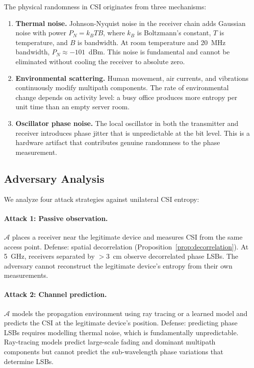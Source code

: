 The physical randomness in CSI originates from three mechanisms:
\begin{enumerate}
\item \textbf{Thermal noise.} Johnson-Nyquist noise in the receiver chain adds Gaussian noise with power $P_N = k_B T B$, where $k_B$ is Boltzmann's constant, $T$ is temperature, and $B$ is bandwidth. At room temperature and 20~MHz bandwidth, $P_N \approx -101$~dBm. This noise is fundamental and cannot be eliminated without cooling the receiver to absolute zero.

\item \textbf{Environmental scattering.} Human movement, air currents, and vibrations continuously modify multipath components. The rate of environmental change depends on activity level: a busy office produces more entropy per unit time than an empty server room.

\item \textbf{Oscillator phase noise.} The local oscillator in both the transmitter and receiver introduces phase jitter that is unpredictable at the bit level. This is a hardware artifact that contributes genuine randomness to the phase measurement.
\end{enumerate}

\subsection{Adversary Analysis}
\label{subsec:adversary}

We analyze four attack strategies against unilateral CSI entropy:

\paragraph{Attack 1: Passive observation.}
$\mathcal{A}$ places a receiver near the legitimate device and measures CSI from the same access point.
Defense: spatial decorrelation (Proposition~\ref{prop:decorrelation}).
At 5~GHz, receivers separated by $>$3~cm observe decorrelated phase LSBs.
The adversary cannot reconstruct the legitimate device's entropy from their own measurements.

\paragraph{Attack 2: Channel prediction.}
$\mathcal{A}$ models the propagation environment using ray tracing or a learned model and predicts the CSI at the legitimate device's position.
Defense: predicting phase LSBs requires modelling thermal noise, which is fundamentally unpredictable.
Ray-tracing models predict large-scale fading and dominant multipath components but cannot predict the sub-wavelength phase variations that determine LSBs.

